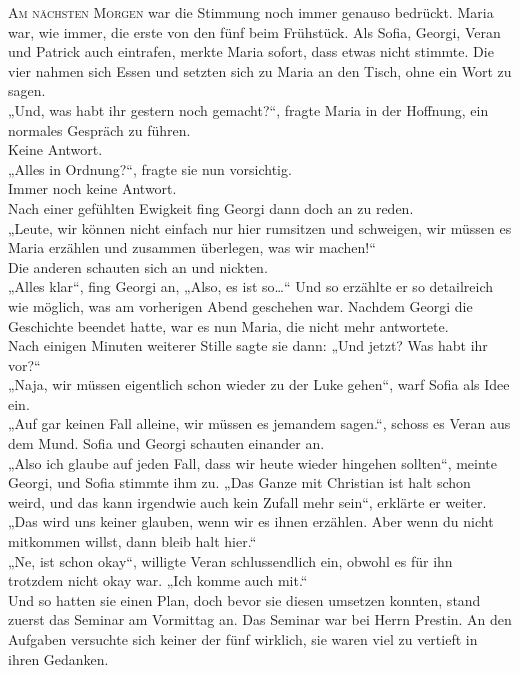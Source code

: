 \documentclass[oneside]{memoir}
\begin{document}
\medskip
\lettrine{A}{m nächsten Morgen} war die Stimmung noch immer genauso bedrückt. Maria war, wie immer, die erste von den fünf beim Frühstück. Als Sofia, Georgi, Veran und Patrick auch eintrafen, merkte Maria sofort, dass etwas nicht stimmte. Die vier nahmen sich Essen und setzten sich zu Maria an den Tisch, ohne ein Wort zu sagen. \\
„Und, was habt ihr gestern noch gemacht?“, fragte Maria in der Hoffnung, ein normales Gespräch zu führen. \\
Keine Antwort. \\
„Alles in Ordnung?“, fragte sie nun vorsichtig. \\
Immer noch keine Antwort. \\
Nach einer gefühlten Ewigkeit fing Georgi dann doch an zu reden. \\
„Leute, wir können nicht einfach nur hier rumsitzen und schweigen, wir müssen es Maria erzählen und zusammen überlegen, was wir machen!“ \\
Die anderen schauten sich an und nickten. \\
„Alles klar“, fing Georgi an, „Also, es ist so\ldots“ Und so erzählte er so detailreich wie möglich, was am vorherigen Abend geschehen war. Nachdem Georgi die Geschichte beendet hatte, war es nun Maria, die nicht mehr antwortete. \\
Nach einigen Minuten weiterer Stille sagte sie dann: „Und jetzt? Was habt ihr vor?“ \\
„Naja, wir müssen eigentlich schon wieder zu der Luke gehen“, warf Sofia als Idee ein. \\
„Auf gar keinen Fall alleine, wir müssen es jemandem sagen.“, schoss es Veran aus dem Mund. Sofia und Georgi schauten einander an. \\
„Also ich glaube auf jeden Fall, dass wir heute wieder hingehen sollten“, meinte Georgi, und Sofia stimmte ihm zu. „Das Ganze mit Christian ist halt schon weird, und das kann irgendwie auch kein Zufall mehr sein“, erklärte er weiter. „Das wird uns keiner glauben, wenn wir es ihnen erzählen. Aber wenn du nicht mitkommen willst, dann bleib halt hier.“ \\
„Ne, ist schon okay“, willigte Veran schlussendlich ein, obwohl es für ihn trotzdem nicht okay war. „Ich komme auch mit.“ \\
Und so hatten sie einen Plan, doch bevor sie diesen umsetzen konnten, stand zuerst das Seminar am Vormittag an. Das Seminar war bei Herrn Prestin. An den Aufgaben versuchte sich keiner der fünf wirklich, sie waren viel zu vertieft in ihren Gedanken.  \\
\end{document}
